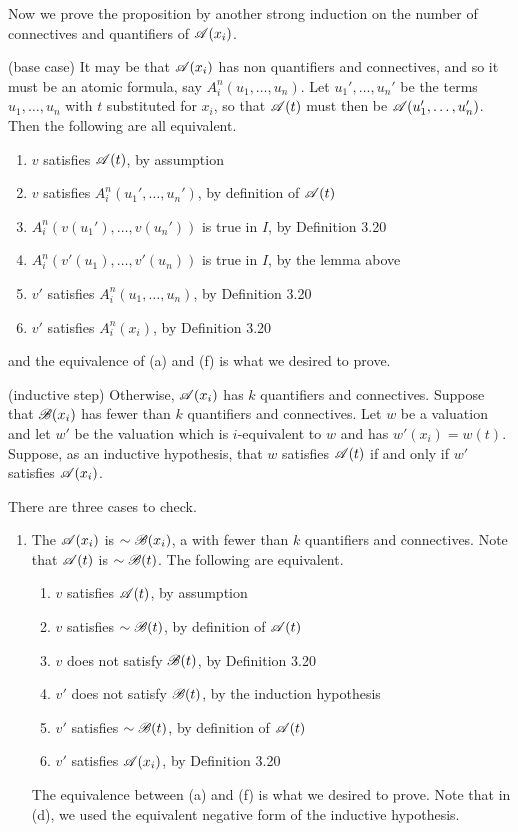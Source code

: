 \begin{proposition}
  Now we prove the proposition by another strong induction on the number of connectives and quantifiers of \(\mathscr{A}(x_i)\).

  (base case) It may be that \(\mathscr{A}(x_i)\) has non quantifiers and connectives, and so it must be an atomic formula, say \(A^n_i(u_1, \dots, u_n)\). Let \(u_1', \dots, u_n'\) be the terms \(u_1, \dots, u_n\) with \(t\) substituted for \(x_i\), so that \(\mathscr{A}(t)\) must then be \(\mathscr{A}(u_1', \dots, u_n')\). Then the following are all equivalent.
  \begin{enumerate}[label=(\alph*), align=left]
    \item \(v\) satisfies \(\mathscr{A}(t)\), by assumption
    \item \(v\) satisfies \(A^n_i(u_1', \dots, u_n')\), by definition of \(\mathscr{A}(t)\)
    \item \(A^n_i(v(u_1'), \dots, v(u_n'))\) is true in \(I\), by Definition 3.20
    \item \(A^n_i(v'(u_1), \dots, v'(u_n))\) is true in \(I\), by the lemma above
    \item \(v'\) satisfies \(A^n_i(u_1, \dots, u_n)\), by Definition 3.20
    \item \(v'\) satisfies \(A^n_i(x_i)\), by Definition 3.20
  \end{enumerate}
  and the equivalence of (a) and (f) is what we desired to prove.

  (inductive step) Otherwise, \(\mathscr{A}(x_i)\) has \(k\) quantifiers and connectives. Suppose that \(\mathscr{B}(x_i)\) has fewer than \(k\) quantifiers and connectives. Let \(w\) be a valuation and let \(w'\) be the valuation which is \(i\)-equivalent to \(w\) and has \(w'(x_i) = w(t)\). Suppose, as an inductive hypothesis, that \(w\) satisfies \(\mathscr{A}(t)\) if and only if \(w'\) satisfies \(\mathscr{A}(x_i)\).

  There are three cases to check.
  \begin{enumerate}
    \item The \wf{} \(\mathscr{A}(x_i)\) is \(\sim\mathscr{B}(x_i)\), a \wf{} with fewer than \(k\) quantifiers and connectives. Note that \(\mathscr{A}(t)\) is \(\sim\mathscr{B}(t)\). The following are equivalent.
      \begin{enumerate}
        \item \(v\) satisfies \(\mathscr{A}(t)\), by assumption
        \item \(v\) satisfies \(\sim\mathscr{B}(t)\), by definition of \(\mathscr{A}(t)\)
        \item \(v\) does not satisfy \(\mathscr{B}(t)\), by Definition 3.20
        \item \(v'\) does not satisfy \(\mathscr{B}(t)\), by the induction hypothesis
        \item \(v'\) satisfies \(\sim\mathscr{B}(t)\), by definition of \(\mathscr{A}(t)\)
        \item \(v'\) satisfies \(\mathscr{A}(x_i)\), by Definition 3.20
      \end{enumerate}
      The equivalence between (a) and (f) is what we desired to prove. Note that in (d), we used the equivalent negative form of the inductive hypothesis.


\end{enumerate}
\end{proposition}
